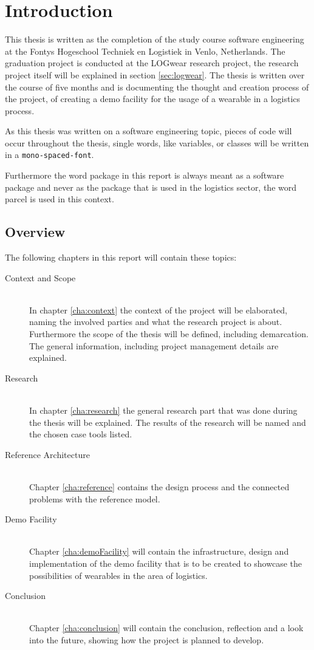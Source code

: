 \chapter{Introduction}
This thesis is written as the completion of the study course software engineering at the Fontys Hogeschool Techniek en Logistiek in Venlo, Netherlands. The graduation project is conducted at the LOGwear research project, the research project itself will be explained in section \ref{sec:logwear}. The thesis is written over the course of five months and is documenting the thought and creation process of the project, of creating a demo facility for the usage of a wearable in a logistics process.

As this thesis was written on a software engineering topic, pieces of code will occur throughout the thesis, single words, like variables, or classes will be written in a \texttt{mono-spaced-font}. 

Furthermore the word \gls{package} in this report is always meant as a software package and never as the package that is used in the logistics sector, the word \gls{parcel} is used in this context.
\section*{Overview}
The following chapters in this report will contain these topics:

\begin{description}
	\item[Context and Scope] \hfill \\
	In chapter \ref{cha:context} the context of the project will be elaborated, naming the involved parties and what the research project is about. Furthermore the scope of the thesis will be defined, including demarcation. The general information, including project management details are explained.
	\item[Research] \hfill \\
	In chapter \ref{cha:research} the general research part that was done during the thesis will be explained. The results of the research will be named and the chosen \gls{case} tools listed.
	\item[Reference Architecture] \hfill \\
	Chapter \ref{cha:reference} contains the design process and the connected problems with the reference model.
	\item[Demo Facility] \hfill \\
	Chapter \ref{cha:demoFacility} will contain the infrastructure, design and implementation of the demo facility that is to be created to showcase the possibilities of wearables in the area of logistics.
	\item[Conclusion] \hfill \\
	Chapter \ref{cha:conclusion} will contain the conclusion, reflection and a look into the future, showing how the project is planned to develop.
\end{description}
